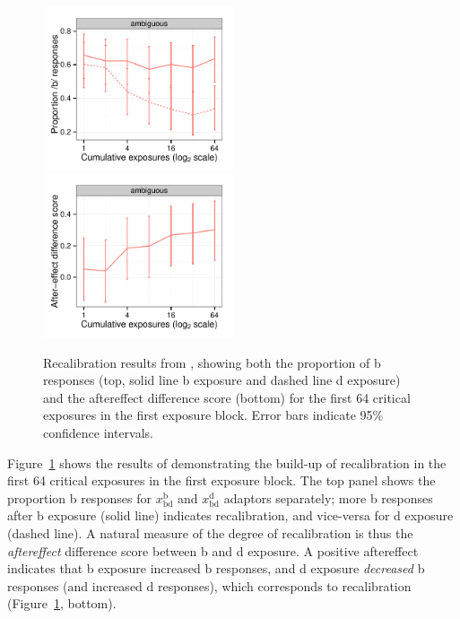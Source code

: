 \begin{figure}[!htb]
  \centering
  \includegraphics[width=0.5\textwidth]{vroomen-bd-recal-first-64.pdf}
  \includegraphics[width=0.5\textwidth]{vroomen-ae-recal-first-64.pdf}
  \caption{Recalibration results from \protect\textcite{Vroomen2007}, showing both the proportion of \ph b responses (top, solid line \ph b exposure and dashed line \ph d exposure) and the aftereffect difference score (bottom) for the first 64 critical exposures in the first exposure block. Error bars indicate 95\% confidence intervals.}
  \label{fig:vroomen-results-64-recal}
\end{figure}

Figure~\ref{fig:vroomen-results-64-recal} shows the results of \textcite{Vroomen2007} demonstrating the build-up of recalibration in the first 64 critical exposures in the first exposure block.  The top panel shows the proportion \ph b responses for $x_\mathrm{bd}^\mathrm{b}$ and $x_\mathrm{bd}^\mathrm{d}$ adaptors separately; more \ph b responses after \ph b exposure (solid line) indicates recalibration, and vice-versa for \ph d exposure (dashed line).  A natural measure of the degree of recalibration is thus the \emph{aftereffect} difference score between \ph b and \ph d exposure.  A positive aftereffect indicates that \ph b exposure increased \ph b responses, and \ph d exposure \emph{decreased} \ph b responses (and increased \ph d responses), which corresponds to recalibration (Figure~\ref{fig:vroomen-results-64-recal}, bottom).

